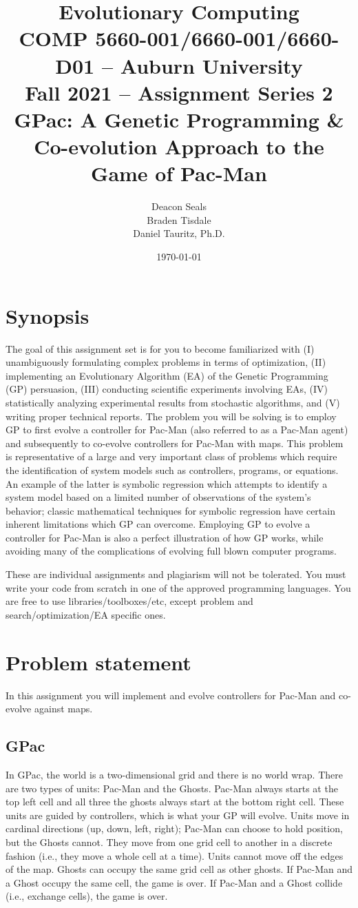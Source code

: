 \documentclass{article}
\title{Evolutionary Computing\\
        COMP 5660-001/6660-001/6660-D01 -- Auburn University\\
        Fall 2021 -- Assignment Series 2\\
        GPac: A Genetic Programming \& Co-evolution Approach to the Game of Pac-Man}
\author{Deacon Seals\\
Braden Tisdale\\
Daniel Tauritz, Ph.D.}
\date{\today}
\begin{document}
\maketitle

\section*{Synopsis}
The goal of this assignment set is for you to become familiarized with (I) unambiguously formulating complex problems in terms of optimization, (II) implementing an Evolutionary Algorithm (EA) of the Genetic Programming (GP) persuasion, (III) conducting scientific experiments involving EAs, (IV) statistically analyzing experimental results from stochastic algorithms, and (V) writing proper technical reports. The problem you will be solving is to employ GP to first evolve a controller for Pac-Man (also referred to as a Pac-Man agent) and subsequently to co-evolve controllers for Pac-Man with maps. This problem is representative of a large and very important class of problems which require the identification of system models such as controllers, programs, or equations. An example of the latter is symbolic regression which attempts to identify a system model based on a limited number of observations of the system's behavior; classic mathematical techniques for symbolic regression have certain inherent limitations which GP can overcome. Employing GP to evolve a controller for Pac-Man is also a perfect illustration of how GP works, while avoiding many of the complications of evolving full blown computer programs.

These are individual assignments and plagiarism will not be tolerated. You must write your code from scratch in one of the approved programming languages. You are free to use libraries/toolboxes/etc, except problem and search/optimization/EA specific ones.

\section*{Problem statement}
In this assignment you will implement and evolve controllers for Pac-Man and co-evolve against maps.

\subsection*{GPac}
In GPac, the world is a two-dimensional grid and there is no world wrap. There are two types of units: Pac-Man and the Ghosts. Pac-Man always starts at the top left cell and all three the ghosts always start at the bottom right cell. These units are guided by controllers, which is what your GP will evolve. Units move in cardinal directions (up, down, left, right); Pac-Man can choose to hold position, but the Ghosts cannot. They move from one grid cell to another in a discrete fashion (i.e., they move a whole cell at a time). Units cannot move off the edges of the map. Ghosts can occupy the same grid cell as other ghosts. If Pac-Man and a Ghost occupy the same cell, the game is over. If Pac-Man and a Ghost collide (i.e., exchange cells), the game is over.
\end{document}
